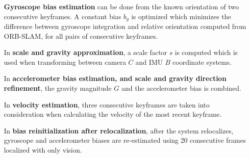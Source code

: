 \textbf{Gyroscope bias estimation} can be done from the known orientation of two consecutive keyframes. A constant bias $b_g$ is optimized which minimizes the difference between gyroscope integration and relative orientation computed from ORB-SLAM, for all pairs of consecutive keyframes.

In \textbf{scale and gravity approximation}, a scale  factor $s$ is computed which is used when transforming between camera $C$ and IMU $B$ coordinate systems.

In \textbf{accelerometer bias estimation, and scale and gravity direction refinement}, the gravity magnitude $G$ and the accelerometer bias is combined.

In \textbf{velocity estimation}, three consecutive keyframes are taken into consideration when calculating the velocity of the most recent keyframe.

In \textbf{bias reinitialization after relocalization}, after the system relocalizes, gyroscope and accelerometer biases are re-estimated using 20 consecutive frames localized with only vision.



\FloatBarrier

